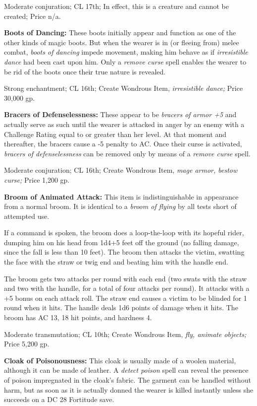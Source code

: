 \documentclass{article}
\begin{document}
Moderate conjuration; CL 17th; In effect, this is a creature and cannot be created; 
Price n/a.

\textbf{Boots of Dancing:} These boots initially appear and function as one of 
the other kinds of magic boots. But when the wearer is in (or fleeing from) melee 
combat, \textit{boots of dancing }impede movement, making him behave as if \textit{irresistible 
dance }had been cast upon him. Only a \textit{remove curse }spell enables the wearer 
to be rid of the boots once their true nature is revealed.

Strong enchantment; CL 16th; Create Wondrous Item, \textit{irresistible dance; 
}Price 30,000 gp.

\textbf{Bracers of Defenselessness: }These appear to be \textit{bracers of armor 
+5 }and actually serve as such until the wearer is attacked in anger by an enemy 
with a Challenge Rating equal to or greater than her level. At that moment and 
thereafter, the bracers cause a -5 penalty to AC. Once their curse is activated, 
\textit{bracers of defenselessness }can be removed only by means of a \textit{remove 
curse }spell.

Moderate conjuration; CL 16th; Create Wondrous Item, \textit{mage armor, bestow 
curse; }Price 1,200 gp.

\textbf{Broom of Animated Attack:} This item is indistinguishable in appearance 
from a normal broom. It is identical to a \textit{broom of flying }by all tests 
short of attempted use.

If a command is spoken, the broom does a loop-the-loop with its hopeful rider, 
dumping him on his head from 1d4+5 feet off the ground (no falling damage, since 
the fall is less than 10 feet). The broom then attacks the victim, swatting the 
face with the straw or twig end and beating him with the handle end.

The broom gets two attacks per round with each end (two swats with the straw and 
two with the handle, for a total of four attacks per round). It attacks with a 
+5 bonus on each attack roll. The straw end causes a victim to be blinded for 1 
round when it hits. The handle deals 1d6 points of damage when it hits. The broom 
has AC 13, 18 hit points, and hardness 4.

Moderate transmutation; CL 10th; Create Wondrous Item, \textit{fly, animate objects; 
}Price 5,200 gp.

\textbf{Cloak of Poisonousness:} This cloak is usually made of a woolen material, 
although it can be made of leather. A \textit{detect poison }spell can reveal the 
presence of poison impregnated in the cloak's fabric. The garment can be handled 
without harm, but as soon as it is actually donned the wearer is killed instantly 
unless she succeeds on a DC 28 Fortitude save.
\end{document}
